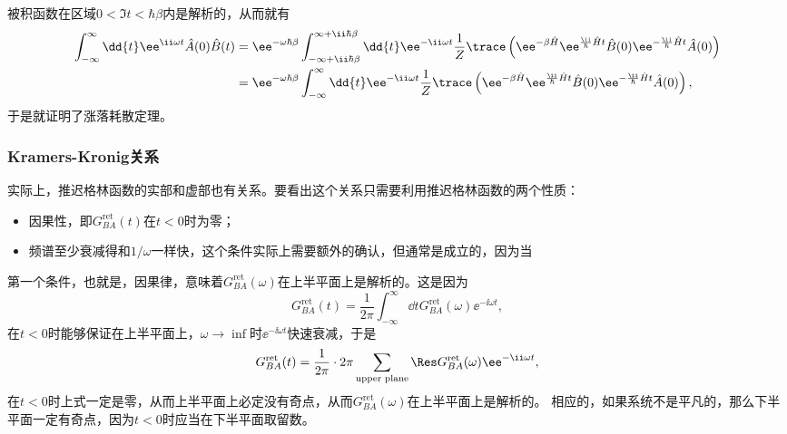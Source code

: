 被积函数在区域$0 < \Im t < \hbar \beta$内是解析的，从而就有
\[
    \begin{aligned}
        \int_{-\infty}^\infty \dd{t} \ee^{\ii \omega t} \hat{A}(0) \hat{B}(t)  &= \ee^{-\omega \hbar \beta} \int_{-\infty+\ii\hbar\beta}^{\infty+\ii\hbar\beta} \dd{t} \ee^{-\ii \omega t} \frac{1}{Z} \trace \left( \ee^{-\beta \hat{H}} \ee^{\frac{\ii}{\hbar} \hat{H} t} \hat{B}(0) \ee^{ - \frac{\ii}{\hbar} \hat{H} t} \hat{A}(0) \right) \\
        &= \ee^{-\omega \hbar \beta} \int_{-\infty}^{\infty} \dd{t} \ee^{-\ii \omega t} \frac{1}{Z} \trace \left( \ee^{-\beta \hat{H}} \ee^{\frac{\ii}{\hbar} \hat{H} t} \hat{B}(0) \ee^{ - \frac{\ii}{\hbar} \hat{H} t} \hat{A}(0) \right),
    \end{aligned}
\]
于是就证明了涨落耗散定理。

\subsubsection{Kramers-Kronig关系}

实际上，推迟格林函数的实部和虚部也有关系。要看出这个关系只需要利用推迟格林函数的两个性质：
\begin{itemize}
    \item 因果性，即$G_{BA}^\text{ret}(t)$在$t<0$时为零；
    \item 频谱至少衰减得和$1/\omega$一样快，这个条件实际上需要额外的确认，但通常是成立的，因为当
\end{itemize}

第一个条件，也就是，因果律，意味着$G_{BA}^\text{ret}(\omega)$在上半平面上是解析的。这是因为
\[
    G_{BA}^\text{ret}(t) = \frac{1}{2\pi} \int_{-\infty}^\infty \dd{t} G_{BA}^\text{ret}(\omega) \ee^{-\ii\omega t},
\]
在$t<0$时能够保证在上半平面上，$\omega\to\inf$时$\ee^{-\ii \omega t}$快速衰减，于是
\[
    G_{BA}^\text{ret}(t) = \frac{1}{2\pi} \cdot 2 \pi \sum_\text{upper plane}  \Res G_{BA}^\text{ret}(\omega) \ee^{-\ii\omega t},
\]
在$t<0$时上式一定是零，从而上半平面上必定没有奇点，从而$G_{BA}^\text{ret}(\omega)$在上半平面上是解析的。
相应的，如果系统不是平凡的，那么下半平面一定有奇点，因为$t<0$时应当在下半平面取留数。

